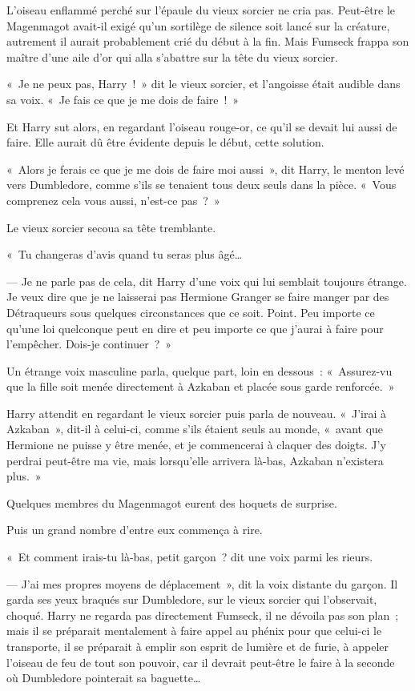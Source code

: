 L'oiseau enflammé perché sur l'épaule du vieux sorcier ne cria pas. Peut-être le Magenmagot avait-il exigé qu'un sortilège de silence soit lancé sur la créature, autrement il aurait probablement crié du début à la fin. Mais Fumseck frappa son maître d'une aile d'or qui alla s'abattre sur la tête du vieux sorcier.

«~Je ne peux pas, Harry~!~» dit le vieux sorcier, et l'angoisse était audible dans sa voix. «~Je fais ce que je me dois de faire~!~»

Et Harry sut alors, en regardant l'oiseau rouge-or, ce qu'il se devait lui aussi de faire. Elle aurait dû être évidente depuis le début, cette solution.

«~Alors je ferais ce que je me dois de faire moi aussi~», dit Harry, le menton levé vers Dumbledore, comme s'ils se tenaient tous deux seuls dans la pièce. «~Vous comprenez cela vous aussi, n'est-ce pas~?~»

Le vieux sorcier secoua sa tête tremblante.

«~Tu changeras d'avis quand tu seras plus âgé…

--- Je ne parle pas de cela, dit Harry d'une voix qui lui semblait toujours étrange. Je veux dire que je ne laisserai pas Hermione Granger se faire manger par des Détraqueurs sous quelques circonstances que ce soit. Point. Peu importe ce qu'une loi quelconque peut en dire et peu importe ce que j'aurai à faire pour l'empêcher. Dois-je continuer~?~»

Un étrange voix masculine parla, quelque part, loin en dessous~: «~Assurez-vu que la fille soit menée directement à Azkaban et placée sous garde renforcée.~»

Harry attendit en regardant le vieux sorcier puis parla de nouveau. «~J'irai à Azkaban~», dit-il à celui-ci, comme s'ils étaient seuls au monde, «~avant que Hermione ne puisse y être menée, et je commencerai à claquer des doigts. J'y perdrai peut-être ma vie, mais lorsqu'elle arrivera là-bas, Azkaban n'existera plus.~»

Quelques membres du Magenmagot eurent des hoquets de surprise.

Puis un grand nombre d'entre eux commença à rire.

«~Et comment irais-tu là-bas, petit garçon~? dit une voix parmi les rieurs.

--- J'ai mes propres moyens de déplacement~», dit la voix distante du garçon. Il garda ses yeux braqués sur Dumbledore, sur le vieux sorcier qui l'observait, choqué. Harry ne regarda pas directement Fumseck, il ne dévoila pas son plan~; mais il se préparait mentalement à faire appel au phénix pour que celui-ci le transporte, il se préparait à emplir son esprit de lumière et de furie, à appeler l'oiseau de feu de tout son pouvoir, car il devrait peut-être le faire à la seconde où Dumbledore pointerait sa baguette…

